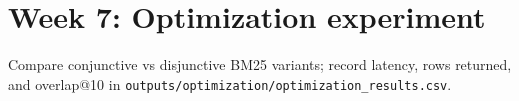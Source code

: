 \section{Week 7: Optimization experiment}
Compare conjunctive vs disjunctive BM25 variants; record latency, rows returned, and overlap@10 in \texttt{outputs/optimization/optimization\_results.csv}.
